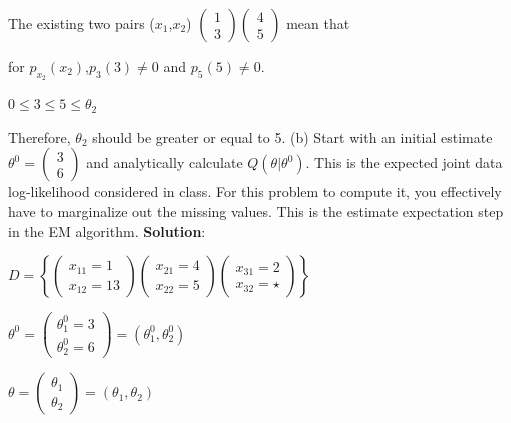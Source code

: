 \documentclass{article}
\begin{document}
The  existing two pairs ($x_1$,$x_2$)  $\left( \begin{array}{c}  1 \\  3
    \end{array} \right)
    \left( \begin{array}{c}  4 \\  5
    \end{array} \right)$ mean that 
    
    for $p_{x_2}(x_2)$,$p_{3}(3) \neq 0$ and $p_{5}(5) \neq 0$.
    
    $0 \leq 3 \leq 5 \leq \theta_2$
    
Therefore, $\theta_2$  should be greater or equal to 5.
\newline
(b) Start with an initial estimate $\theta^{0}= \left( \begin{array}{c}  3 \\  6
    \end{array} \right)$ and analytically calculate $Q(\theta | \theta^{0})$. 
This is the expected joint data log-likelihood considered in class. For this problem to compute it, you effectively have to marginalize out the missing values. This is the estimate expectation step in the EM algorithm.
\newline
\textbf{Solution}:

\begin{math}
    D = \left\{\left( \begin{array}{c}  x_{11} = 1 \\  x_{12} = 13
    \end{array} \right)
    \left( \begin{array}{c}  x_{21} =  4 \\ x_{22} = 5
    \end{array} \right)
    \left( \begin{array}{c} x_{31} = 2 \\  x_{32} = \star
    \end{array} \right)\right\}
\end{math}

$\theta^{0}= \left( \begin{array}{c}  \theta_1^{0} = 3 \\ \theta_2^{0} =  6
    \end{array} \right) = (\theta_1^{0},\theta_2^{0})$ 
    
$\theta= \left( \begin{array}{c}  \theta_1  \\ \theta_2
    \end{array} \right) = (\theta_1,\theta_2)$
\end{document}
